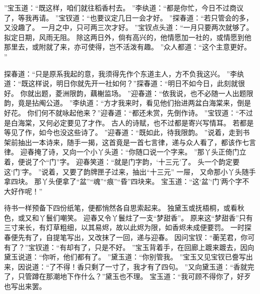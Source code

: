 ”宝玉道：“既这样，咱们就往稻香村去。
”李纨道：“都是你忙，今日不过商议了，等我再请。
”宝钗道：“也要议定几日一会才好。
”探春道：“若只管会的多，又没趣了。
一月之中，只可两三次才好。
”宝钗点头道：“一月只要两次就够了。
拟定日期，风雨无阻。
除这两日外，倘有高兴的，他情愿加一社的，或情愿到他那里去，或附就了来，亦可使得，岂不活泼有趣。
”众人都道：“这个主意更好。
”\par
探春道：“只是原系我起的意，我须得先作个东道主人，方不负我这兴。
”李纨道：“既这样说，明日你就先开一社如何？”探春道：“明日不如今日，此刻就很好。
你就出题，菱洲限韵，藕榭监场。
”迎春道：“依我说，也不必随一人出题限韵，竟是拈阄公道。
”李纨道：“方才我来时，看见他们抬进两盆白海棠来，倒是好花。
你们何不就咏起他来？”迎春道：“都还未赏，先倒作诗。
”宝钗道：“不过是白海棠，又何必定要见了才作。
古人的诗赋，也不过都是寄兴写情耳。
若都是等见了作，如今也没这些诗了。
”迎春道：“既如此，待我限韵。
”说着，走到书架前抽出一本诗来，随手一揭，这首竟是一首七言律，递与众人看了，都该作七言律。
迎春掩了诗，又向一个小丫头道：“你随口说一个字来。
”那丫头正倚门立着，便说了个“门”字。
迎春笑道：“就是门字韵，‘十三元’了。
头一个韵定要这‘门’字。
”说着，又要了韵牌匣子过来，抽出“十三元” 一屉， 又命那小丫头随手拿四块。
那丫头便拿了“盆”“魂”“痕”“昏”四块来。
宝玉道：“这‘盆’‘门’两个字不大好作呢！”\par
待书一样预备下四份纸笔，便都悄然各自思索起来。
独黛玉或抚梧桐，或看秋色，或又和丫鬟们嘲笑。
迎春又令丫鬟炷了一支“梦甜香”。
原来这“梦甜香”只有三寸来长，有灯草粗细，以其易烬，故以此烬为限，如香烬未成便要罚。
一时探春便先有了，自提笔写出，又改抹了一回，递与迎春。
因问宝钗：“蘅芜君，你可有了？”宝钗道：“有却有了，只是不好。
”宝玉背着手，在回廊上踱来踱去，因向黛玉说道：“你听，他们都有了。
”黛玉道：“你别管我。
”宝玉又见宝钗已誊写出来，因说道：“了不得！香只剩了一寸了，我才有了四句。
”又向黛玉道：“香就完了，只管蹲在那潮地下作什么？”黛玉也不理。
宝玉道：“我可顾不得你了，好歹也写出来罢。
